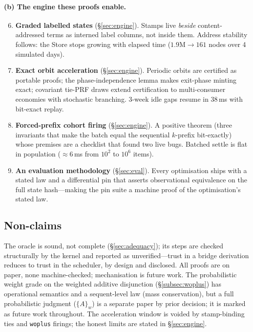 \documentclass[11pt]{article}
\theoremstyle{definition}
\theoremstyle{remark}
\begin{document}
\paragraph{(b) The engine these proofs enable.}

\begin{enumerate}
\setcounter{enumi}{5}
\item \textbf{Graded labelled states} (\S\ref{sec:engine}).  Stamps live
  \emph{beside} content-addressed terms as interned label columns, not inside
  them.  Address stability follows: the Store stops growing with elapsed time
  ($1.9\text{M} \to 161$ nodes over 4 simulated days).

\item \textbf{Exact orbit acceleration} (\S\ref{sec:engine}).  Periodic orbits
  are certified as portable proofs; the phase-independence lemma makes exit-phase
  minting exact; covariant tie-PRF draws extend certification to
  multi-consumer economies with stochastic branching.  3-week idle gaps resume in
  38\,ms with bit-exact replay.

\item \textbf{Forced-prefix cohort firing} (\S\ref{sec:engine}).  A positive
  theorem (three invariants that make the batch equal the sequential $k$-prefix
  bit-exactly) whose premises are a checklist that found two live bugs.  Batched
  settle is flat in population ($\approx 6$\,ms from $10^2$ to $10^6$ items).

\item \textbf{An evaluation methodology} (\S\ref{sec:eval}).  Every optimisation
  ships with a stated law and a differential pin that asserts observational
  equivalence on the full state hash---making the pin suite a machine proof of
  the optimisation's stated law.
\end{enumerate}

\subsection{Non-claims}

The oracle is sound, not complete (\S\ref{sec:adequacy}); its steps are checked
structurally by the kernel and reported as unverified---trust in a bridge
derivation reduces to trust in the scheduler, by design and disclosed.  All proofs
are on paper, none machine-checked; mechanisation is future work.  The
probabilistic weight grade on the weighted additive disjunction
(\S\ref{subsec:woplus}) has operational semantics and a sequent-level law (mass
conservation), but a full probabilistic judgment ($\{A\}_w$) is a separate paper
by prior decision; it is marked as future work throughout.  The acceleration
window is voided by stamp-binding ties and \texttt{woplus} firings; the honest
limits are stated in \S\ref{sec:engine}.
\end{document}
